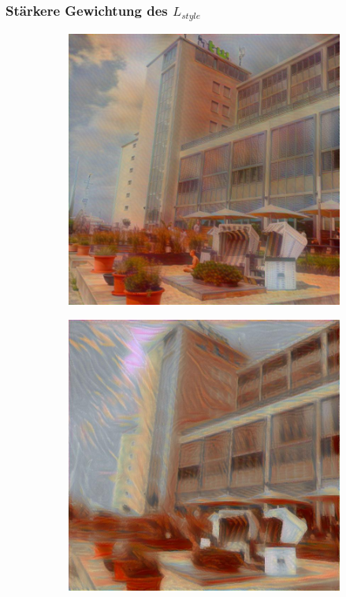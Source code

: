 \begin{frame}
    \frametitle{Stärkere Gewichtung des $ L_{style} $}

    \begin{figure}[H]
        \centering
        \begin{subfigure}[h]{0.49\textwidth}
            \centering
            \includegraphics[width=\textwidth]{resources/content/experiments/a__the_scream__768x768__style-weight_1e+06__tv-weight_0e+00.jpg}
        \end{subfigure}
        \begin{subfigure}[h]{0.49\textwidth}
            \centering
            \includegraphics[width=\textwidth]{resources/content/experiments/a__the_scream__768x768__style-weight_1e+09__tv-weight_0e+00.jpg}

\end{subfigure}
\end{figure}
\end{frame}
